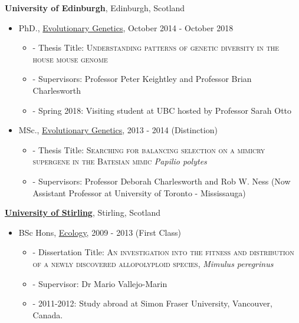 \documentclass[11pt]{article}
\newenvironment{outerlist}[1][\enskip\textbullet]%
        {\begin{itemize}[#1,leftmargin=*]}{\end{itemize}%
         \vspace{-.6\baselineskip}}
\newenvironment{innerlist}[1][\enskip\textbullet]%
        {\begin{itemize}[#1,leftmargin=*,parsep=0pt,itemsep=0pt,topsep=0pt,partopsep=0pt]}
        {\end{itemize}}
\begin{document}
{\textbf{University of Edinburgh}},
Edinburgh, Scotland
\begin{outerlist}

\item[] PhD.,
             \href{http://www.ed.ac.uk/biology/evolutionary-biology} {Evolutionary Genetics},
             October 2014 - October 2018  
        \begin{innerlist}
        \item[]- Thesis Title: \textsc{Understanding patterns of genetic diversity in the house mouse genome}
        \item[]- Supervisors: Professor Peter Keightley and Professor Brian Charlesworth
        \item[]- Spring 2018: Visiting student at UBC hosted by Professor Sarah Otto

        \end{innerlist}

\item[] MSc.,
        \href{http://qgen.bio.ed.ac.uk/}
             {Evolutionary Genetics},
             2013 - 2014 (Distinction)
        \begin{innerlist}
        \item[]- Thesis Title: \textsc{Searching for balancing selection on a mimicry supergene in the Batesian mimic} \textit{Papilio polytes}
        \item[]- Supervisors: Professor Deborah Charlesworth and Rob W. Ness (Now Assistant Professor at University of Toronto - Mississauga)

        \end{innerlist}
\end{outerlist}
\vspace{.1in}
\href{}{\textbf{University of Stirling}},
Stirling, Scotland
\begin{outerlist}
\item[] BSc Hons,
        \href{http://www.stir.ac.uk/natural-sciences/about-us/bes/}
             {Ecology}, 2009 - 2013 (First Class)
        \begin{innerlist}
        \item[]- Dissertation Title: \textsc{An investigation into the fitness and distribution of a newly discovered allopolyploid species,} \textit{Mimulus peregrinus}
        \item[]- Supervisor:
                   Dr Mario Vallejo-Marin
		\item[]- 2011-2012: Study abroad at Simon Fraser University, Vancouver, Canada.
        \end{innerlist}
\end{outerlist}
\end{document}
